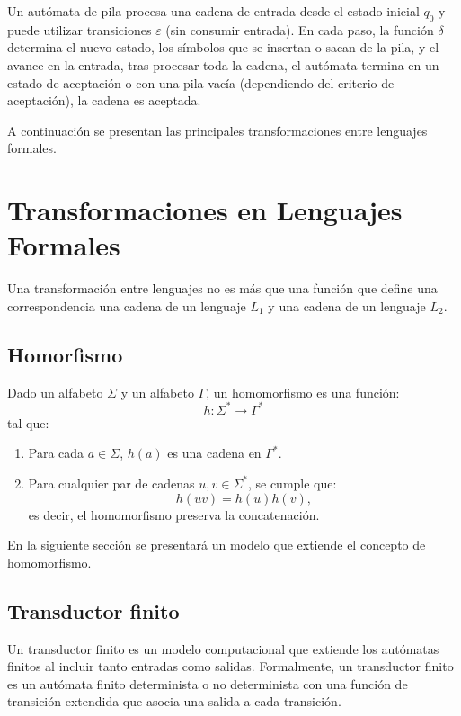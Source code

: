 \documentclass[12pt]{article}
\begin{document}
Un autómata de pila procesa una cadena de entrada desde el estado inicial $q_0$ y 
puede utilizar transiciones $\varepsilon$ (sin consumir entrada). En cada paso, la función $\delta$
determina el nuevo estado, los símbolos que se insertan o sacan de la pila, y el avance en la entrada, 
tras procesar toda la cadena, el autómata termina en un estado de aceptación o con una pila vacía 
(dependiendo del criterio de aceptación), la cadena es aceptada.

A continuación se presentan las principales transformaciones entre lenguajes formales.

\section{Transformaciones en Lenguajes Formales}

Una transformación entre lenguajes no es más que una función que define una correspondencia una cadena
de un lenguaje $L_1$ y una cadena de un lenguaje $L_2$.

\subsection{Homorfismo}

Dado un alfabeto \( \Sigma \) y un alfabeto \( \Gamma \), un homomorfismo es una función:
\[
      h: \Sigma^* \to \Gamma^*
\]
tal que:
\begin{enumerate}
      \item Para cada \( a \in \Sigma \), \( h(a) \) es una cadena en \( \Gamma^* \).
      \item Para cualquier par de cadenas \( u, v \in \Sigma^* \), se cumple que:
            \[
                  h(uv) = h(u) h(v),
            \]
            es decir, el homomorfismo preserva la concatenación.
\end{enumerate}

En la siguiente sección se presentará un modelo que extiende el concepto de homomorfismo.

\subsection{Transductor finito}

Un transductor finito es un modelo computacional que extiende los autómatas finitos al incluir tanto entradas como salidas.
Formalmente, un transductor finito es un autómata finito determinista o no determinista con una función de transición extendida
que asocia una salida a cada transición.
\end{document}
